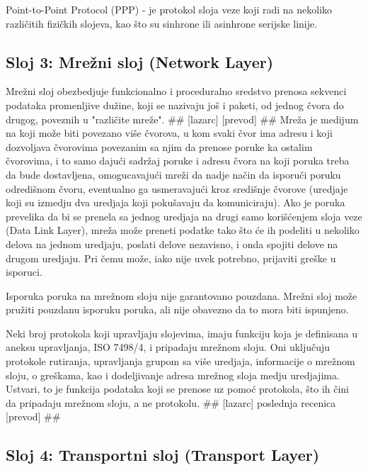 \documentclass[a4paper,12pt, master]{etf}
\begin{document}
	Point-to-Point Protocol (PPP) - je protokol sloja veze koji radi na nekoliko razli\v{c}itih
	fizi\v{c}kih slojeva, kao \v{s}to su sinhrone ili asinhrone serijske linije.

	\subsection{Sloj 3: Mre\v{z}ni sloj (Network Layer)}

	Mre\v{z}ni sloj obezbedjuje funkcionalno i proceduralno sredstvo prenosa sekvenci podataka
	promenljive du\v{z}ine, koji se nazivaju jo\v{s} i paketi, od jednog \v{c}vora do drugog, poveznih u
    "razli\v{c}ite mre\v{z}e". \#\# [lazarc] [prevod] \#\# Mre\v{z}a je medijum na koji mo\v{z}e biti 
    povezano vi\v{s}e \v{c}vorova, u kom svaki \v{c}vor ima adresu i koji dozvoljava \v{c}vorovima povezanim 
    sa njim da prenose poruke ka ostalim \v{c}vorovima, i to samo daju\'{c}i sadr\v{z}aj poruke i adresu 
    \v{c}vora na koji poruka treba da bude dostavljena, omogucavaju\'{c}i mre\v{z}i da nadje na\v{c}in da 
    isporu\v{c}i poruku odredi\v{s}nom \v{c}voru, eventualno ga usmeravaju\'{c}i kroz sredi\v{s}nje 
    \v{c}vorove (uredjaje koji su izmedju dva uredjaja koji poku\v{s}avaju da komuniciraju). Ako je poruka 
    prevelika da bi se prenela sa jednog uredjaja na drugi samo kori\v{s}\'{c}enjem sloja veze (Data Link 
    Layer), mre\v{z}a mo\v{z}e preneti podatke tako \v{s}to \'{c}e ih podeliti u nekoliko delova na jednom 
    uredjaju, poslati delove nezavisno, i onda spojiti delove na drugom uredjaju. Pri \v{c}emu mo\v{z}e, iako 
    nije uvek potrebno, prijaviti gre\v{s}ke u isporuci.

	Isporuka poruka na mre\v{z}nom sloju nije garantovano pouzdana. Mre\v{z}ni sloj mo\v{z}e pru\v{z}iti 
	pouzdanu isporuku poruka, ali nije obavezno da to mora biti ispunjeno.

	Neki broj protokola koji upravljaju slojevima, imaju funkciju koja je definisana u aneksu
	upravljanja, ISO 7498/4, i pripadaju mre\v{z}nom sloju. Oni uklju\v{c}uju protokole rutiranja,
	upravljanja grupom sa vi\v{s}e uredjaja, informacije o mre\v{z}nom sloju, o gre\v{s}kama, kao i 
	dodeljivanje adresa mre\v{z}nog sloja medju uredjajima. Ustvari, to je funkcija podataka koji 
	se prenose uz pomo\'{c} protokola, \v{s}to ih \v{c}ini da pripadaju mre\v{z}nom sloju, a ne protokolu. 
	\#\# [lazarc] poslednja	recenica [prevod] \#\#

	\subsection{Sloj 4: Transportni sloj (Transport Layer)}
\end{document}
